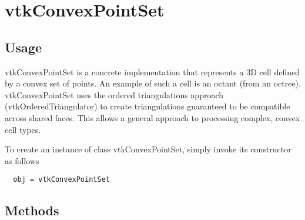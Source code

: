 \section{vtkConvexPointSet}

\subsection{Usage}

 vtkConvexPointSet is a concrete implementation that represents a 3D cell
 defined by a convex set of points. An example of such a cell is an octant
 (from an octree). vtkConvexPointSet uses the ordered triangulations
 approach (vtkOrderedTriangulator) to create triangulations guaranteed to
 be compatible across shared faces. This allows a general approach to
 processing complex, convex cell types.

To create an instance of class vtkConvexPointSet, simply
invoke its constructor as follows
\begin{verbatim}
  obj = vtkConvexPointSet
\end{verbatim}
\subsection{Methods}

